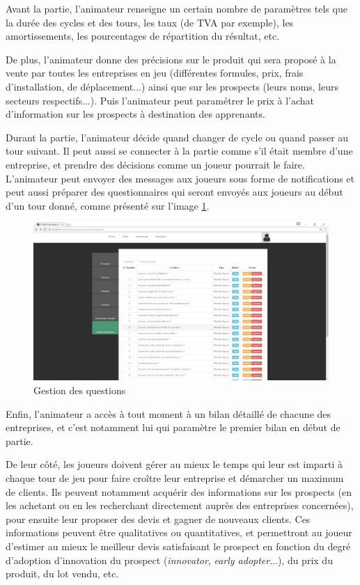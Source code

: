         Avant la partie, l'animateur renseigne un certain nombre de paramètres tels que la durée des cycles et des tours, les taux (de TVA par exemple), les amortissements, les pourcentages de répartition du résultat, etc.

        De plus, l'animateur donne des précisions sur le produit qui sera proposé à la vente par toutes les entreprises en jeu (différentes formules, prix, frais d'installation, de déplacement...) ainsi que sur les prospects (leurs noms, leurs secteurs respectifs...). Puis l'animateur peut paramétrer le prix à l'achat d'information sur les prospects à destination des apprenants.

        Durant la partie, l'animateur décide quand changer de cycle ou quand passer au tour suivant. Il peut aussi se connecter à la partie comme s'il était membre d'une entreprise, et prendre des décisions comme un joueur pourrait le faire.
        L'animateur peut envoyer des messages aux joueurs sous forme de notifications et peut aussi préparer des questionnaires qui seront envoyés aux joueurs au début d'un tour donné, comme présenté sur l'image \ref{questionnaire}.

        \begin{figure}
        	\centering
            \includegraphics[scale=0.88]{images/questionnaire.png}
            \caption{Gestion des questions}
            \label{questionnaire}
        \end{figure}


        Enfin, l'animateur a accès à tout moment à un bilan détaillé de chacune des entreprises, et c'est notamment lui qui paramètre le premier bilan en début de partie.

        De leur côté, les joueurs doivent gérer au mieux le temps qui leur est imparti à chaque tour de jeu pour faire croître leur entreprise et démarcher un maximum de clients. Ils peuvent notamment acquérir des informations sur les prospects (en les achetant ou en les recherchant directement auprès des entreprises concernées), pour ensuite leur proposer des devis et gagner de nouveaux clients. Ces informations peuvent être qualitatives ou quantitatives, et permettront au joueur d'estimer au mieux le meilleur devis satisfaisant le prospect en fonction du degré d'adoption d'innovation du prospect (\emph{innovator}, \emph{early adopter}...), du prix du produit, du lot vendu, etc.

